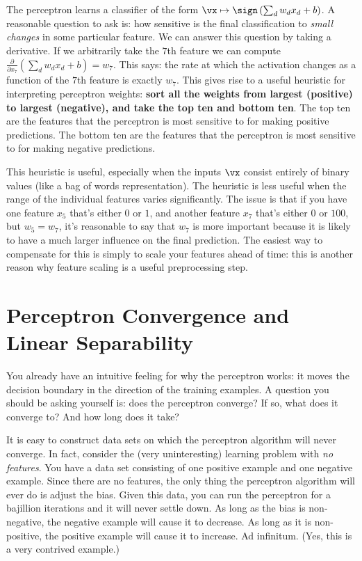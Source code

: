 The perceptron learns a classifier of the form $\vx \mapsto \sign\left( \sum_d w_d x_d + b \right)$.
A reasonable question to ask is: how sensitive is the final classification to \emph{small changes} in some particular feature.
We can answer this question by taking a derivative.
If we arbitrarily take the $7$th feature we can compute $\frac \partial {\partial x_7} \left( \sum_d w_d x_d + b \right) = w_7$.
This says: the rate at which the activation changes as a function of the $7$th feature is exactly $w_7$.
This gives rise to a useful heuristic for interpreting perceptron weights:
\textbf{sort all the weights from largest (positive) to largest (negative), and take the top ten and bottom ten}.
The top ten are the features that the perceptron is most sensitive to for making positive predictions.
The bottom ten are the features that the perceptron is most sensitive to for making negative predictions.

This heuristic is useful, especially when the inputs $\vx$ consist entirely of binary values (like a bag of words representation).
The heuristic is less useful when the range of the individual features varies significantly.
The issue is that if you have one feature $x_5$ that's either $0$ or $1$, and another feature $x_7$ that's either $0$ or $100$, but $w_5 = w_7$, it's reasonable to say that $w_7$ is more important because it is likely to have a much larger influence on the final prediction.
The easiest way to compensate for this is simply to scale your features ahead of time:
this is another reason why feature scaling is a useful preprocessing step.


\section{Perceptron Convergence and Linear Separability}

You already have an intuitive feeling for why the perceptron works: it
moves the decision boundary in the direction of the training
examples.  A question you should be asking yourself is: does the
perceptron converge?  If so, what does it converge to?  And how long
does it take?

It is easy to construct data sets on which the perceptron algorithm
will never converge.  In fact, consider the (very uninteresting)
learning problem with \emph{no features}.  You have a data set
consisting of one positive example and one negative example.  Since
there are no features, the only thing the perceptron algorithm will
ever do is adjust the bias.  Given this data, you can run the
perceptron for a bajillion iterations and it will never settle down.
As long as the bias is non-negative, the negative example will cause
it to decrease.  As long as it is non-positive, the positive example
will cause it to increase.  Ad infinitum.  (Yes, this is a very
contrived example.)

